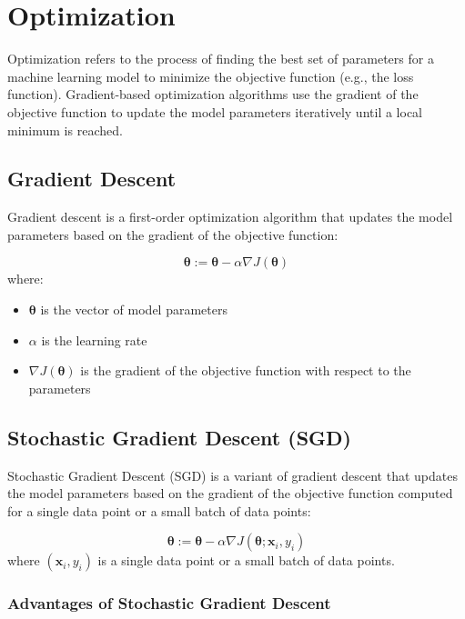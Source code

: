\documentclass[12pt]{article}
\begin{document}
\section{Optimization}

Optimization refers to the process of finding the best set of parameters for a machine learning model to minimize the objective function (e.g., the loss function). Gradient-based optimization algorithms use the gradient of the objective function to update the model parameters iteratively until a local minimum is reached.

\subsection{Gradient Descent}

Gradient descent is a first-order optimization algorithm that updates the model parameters based on the gradient of the objective function:

$$\boldsymbol{\theta} := \boldsymbol{\theta} - \alpha \nabla J(\boldsymbol{\theta})$$
where:
\begin{itemize}
\item $\boldsymbol{\theta}$ is the vector of model parameters
\item $\alpha$ is the learning rate
\item $\nabla J(\boldsymbol{\theta})$ is the gradient of the objective function with respect to the parameters
\end{itemize}

\subsection{Stochastic Gradient Descent (SGD)}

Stochastic Gradient Descent (SGD) is a variant of gradient descent that updates the model parameters based on the gradient of the objective function computed for a single data point or a small batch of data points:

$$\boldsymbol{\theta} := \boldsymbol{\theta} - \alpha \nabla J(\boldsymbol{\theta}; \mathbf{x}_i, y_i)$$
where $(\mathbf{x}_i, y_i)$ is a single data point or a small batch of data points.

\subsubsection{Advantages of Stochastic Gradient Descent}
\end{document}

